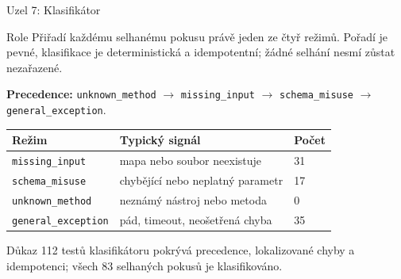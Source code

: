 \documentclass[aspectratio=169,10pt]{beamer}
\begin{document}
\begin{frame}[t]{Uzel 7: Klasifikátor}
  \footnotesize
  \begin{block}{Role}
    Přiřadí každému selhanému pokusu právě jeden ze čtyř režimů. Pořadí je
    pevné, klasifikace je deterministická a idempotentní; žádné selhání nesmí
    zůstat nezařazené.
  \end{block}

  \textbf{Precedence:} \texttt{unknown\_method} $\rightarrow$
  \texttt{missing\_input} $\rightarrow$ \texttt{schema\_misuse} $\rightarrow$
  \texttt{general\_exception}.

  \begin{table}
    \centering
    \begin{tabular}{@{}p{3.1cm}p{7.0cm}p{1.5cm}@{}}
      \toprule
      \textbf{Režim} & \textbf{Typický signál} & \textbf{Počet} \\
      \midrule
      \texttt{missing\_input} & mapa nebo soubor neexistuje & 31 \\
      \texttt{schema\_misuse} & chybějící nebo neplatný parametr & 17 \\
      \texttt{unknown\_method} & neznámý nástroj nebo metoda & 0 \\
      \texttt{general\_exception} & pád, timeout, neošetřená chyba & 35 \\
      \bottomrule
    \end{tabular}
  \end{table}

  \begin{alertblock}{Důkaz}
    112 testů klasifikátoru pokrývá precedence, lokalizované chyby a
    idempotenci; všech 83 selhaných pokusů je klasifikováno.
  \end{alertblock}
\end{frame}
\end{document}
